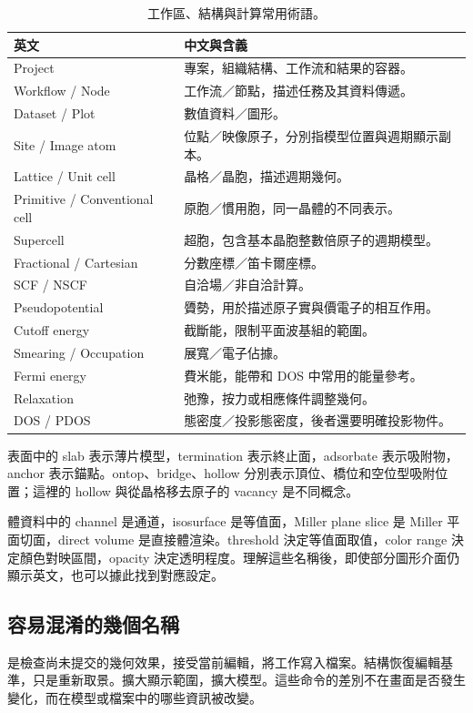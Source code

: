 \begin{table}[H]
\centering
\caption{工作區、結構與計算常用術語。}
\begin{tabularx}{\linewidth}{lX}
\toprule
英文 & 中文與含義 \\
\midrule
Project & 專案，組織結構、工作流和結果的容器。\\
Workflow / Node & 工作流／節點，描述任務及其資料傳遞。\\
Dataset / Plot & 數值資料／圖形。\\
Site / Image atom & 位點／映像原子，分別指模型位置與週期顯示副本。\\
Lattice / Unit cell & 晶格／晶胞，描述週期幾何。\\
Primitive / Conventional cell & 原胞／慣用胞，同一晶體的不同表示。\\
Supercell & 超胞，包含基本晶胞整數倍原子的週期模型。\\
Fractional / Cartesian & 分數座標／笛卡爾座標。\\
SCF / NSCF & 自洽場／非自洽計算。\\
Pseudopotential & 贗勢，用於描述原子實與價電子的相互作用。\\
Cutoff energy & 截斷能，限制平面波基組的範圍。\\
Smearing / Occupation & 展寬／電子佔據。\\
Fermi energy & 費米能，能帶和 DOS 中常用的能量參考。\\
Relaxation & 弛豫，按力或相應條件調整幾何。\\
DOS / PDOS & 態密度／投影態密度，後者還要明確投影物件。\\
\bottomrule
\end{tabularx}
\end{table}

表面中的 slab 表示薄片模型，termination 表示終止面，adsorbate 表示吸附物，anchor 表示錨點。ontop、bridge、hollow 分別表示頂位、橋位和空位型吸附位置；這裡的 hollow 與從晶格移去原子的 vacancy 是不同概念。

體資料中的 channel 是通道，isosurface 是等值面，Miller plane slice 是 Miller 平面切面，direct volume 是直接體渲染。threshold 決定等值面取值，color range 決定顏色對映區間，opacity 決定透明程度。理解這些名稱後，即使部分圖形介面仍顯示英文，也可以據此找到對應設定。

\subsection{容易混淆的幾個名稱}

是檢查尚未提交的幾何效果，接受當前編輯，將工作寫入檔案。結構恢復編輯基準，只是重新取景。擴大顯示範圍，擴大模型。這些命令的差別不在畫面是否發生變化，而在模型或檔案中的哪些資訊被改變。

